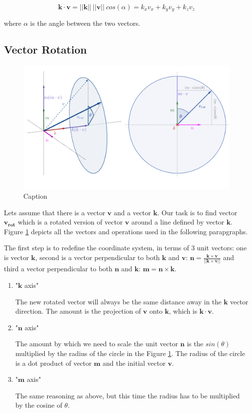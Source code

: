 $$\bm{k} \cdot \bm{v} = ||\bm{k}||~||\bm{v}||~cos(\alpha) = k_x v_x + k_y v_y + k_z v_z$$

where $\alpha$ is the angle between the two vectors.

\subsection{Vector Rotation}

\begin{figure}
    \centering
    \includegraphics[scale=3]{imgs_tomas/rodrigues_3d2d.png}
    \caption{Caption}
    \label{fig:rodrigues3d2d}
\end{figure}

Lets assume that there is a vector $\bm{v}$ and a vector $\bm{k}$. Our task is to find vector $\bm{v_{rot}}$ which is a rotated version of vector $\bm{v}$ around a line defined by vector $\bm{k}$. Figure \ref{fig:rodrigues3d2d} depicts all the vectors and operations used in the following parapgraphs.

The first step is to redefine the coordinate system, in terms of 3 unit vectors: one is vector $\bm{k}$, second is a vector perpendicular to both $\bm{k}$ and $\bm{v}$: $\bm{n} = \frac{\bm{k} \times \bm{v}}{||\bm{k} \times \bm{v}||}$ and third a vector perpendicular to both $\bm{n}$ and $\bm{k}$: $\bm{m} = \bm{n} \times \bm{k}$.

\begin{enumerate}
    \item "$\bm{k}$ axis"
    
    The new rotated vector will always be the same distance away in the $\bm{k}$ vector direction. The amount is the projection of $\bm{v}$ onto $\bm{k}$, which is $\bm{k} \cdot \bm{v}$.
    
    \item "$\bm{n}$ axis"
    
    The amount by which we need to scale the unit vector $\bm{n}$ is the $sin(\theta)$ multiplied by the radius of the circle in the Figure \ref{fig:rodrigues3d2d}. The radius of the circle is a dot product of vector $\bm{m}$ and the initial vector $\bm{v}$.
    \item "$\bm{m}$ axis"
    
    The same reasoning as above, but this time the radius has to be multiplied by the cosine of $\theta$.
\end{enumerate}

